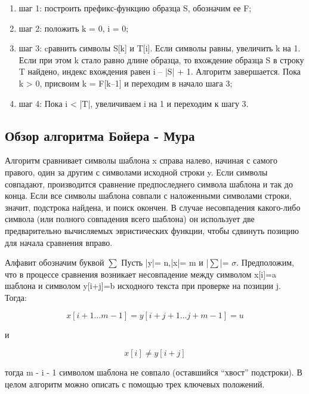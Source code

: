 \documentclass[../main.tex]{subfiles}
\begin{document}
	\begin{enumerate}[1)]
		\item шаг 1: построить префикс-функцию образца S, обозначим ее F; \\
		\item шаг 2: положить k = 0, i = 0; \\
		\item шаг 3: cравнить символы S[k] и T[i].
		Если символы равны, увеличить k на 1.
		Если при этом k стало равно длине образца, то вхождение образца S в строку T найдено, индекс вхождения равен i – |S| + 1. 
		Алгоритм завершается. Пока k > 0, присвоим k = F[k–1] и переходим в начало шага 3; \\
		\item шаг 4: Пока i < |T|, увеличиваем i на 1 и переходим к шагу 3.
	\end{enumerate}


\subsection{Обзор алгоритма Бойера - Мура}

	Алгоритм сравнивает символы шаблона x справа налево, начиная с самого правого, один за другим с символами исходной строки y. 
	Если символы совпадают, производится сравнение предпоследнего символа шаблона и так до конца. 
	Если все символы шаблона совпали с наложенными символами строки, значит, подстрока найдена, и поиск окончен. 
	В случае несовпадения какого-либо символа (или полного совпадения всего шаблона) он использует две предварительно вычисляемых эвристических функции, чтобы сдвинуть позицию для начала сравнения вправо.
	
	Алфавит обозначим буквой $\sum$ Пусть |y|= n,|x|= m и |$\sum$|= $\sigma$. 
	Предположим, что в процессе сравнения возникает несовпадение между символом x[i]=a шаблона и символом y[i+j]=b исходного текста при проверке на позиции j. Тогда:
	
	\begin{equation}
		x[i + 1 ... m - 1] = y[i + j + 1 ... j +m - 1] = u
	\end{equation}
	
	и
	
	\begin{equation}
		x[i] \neq y[i + j]
	\end{equation}
	
	тогда m - i - 1 символом шаблона не совпало (оставшийся “хвост” подстроки). 
	В целом алгоритм можно описать с помощью трех ключевых положений.
	
\end{document}
